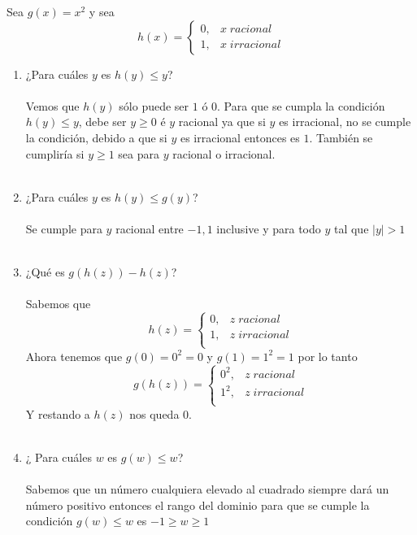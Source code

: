\begin{ej}
Sea $g(x)=x^2$ y sea 
\begin{equation}
h(x) = \left\lbrace
\begin{array}{rr}
0, & x \; racional\\
1, & x \; irracional
\end{array}
\right.
\end{equation}
\begin{enumerate}[\bfseries i)]
\item ¿Para cuáles $y$ es $h(y)\leq y$?\\\\
Vemos que $h(y)$ sólo puede ser $1$ ó $0$. Para que se cumpla la condición $h(y)\leq y$, \; debe ser $y\geq 0$ é $y$ racional ya que si $y$ es irracional, no se cumple la condición, debido a que si $y$ es irracional  entonces es $1$. También se cumpliría si $y\geq 1$ sea para $y$ racional o irracional.\\\\

\item ¿Para cuáles $y$ es $h(y) \leq g(y)$?\\\\
Se cumple para $y$ racional entre $-1,1$ inclusive y para todo $y$ tal que $|y| > 1$\\\\

\item ¿Qué es $g(h(z)) - h(z)$?\\\\
Sabemos que 
\begin{equation}
h(z) = \left\lbrace
\begin{array}{rl}
0, & z \; racional\\
1, & z \; irracional\\
\end{array}
\right.
\end{equation}
Ahora tenemos que $g(0) = 0^2 = 0$ \; y \; $g(1)=1^2=1$ por lo tanto 
\begin{equation}
g(h(z)) = \left\lbrace
\begin{array}{rl}
0^2, & z \; racional\\
1^2, & z \; irracional\\
\end{array}
\right.
\end{equation}
Y restando a $h(z)$ nos queda $0$.\\\\
\item ¿ Para cuáles $w$ es $g(w) \leq w$?\\\\
Sabemos que un número cualquiera elevado al cuadrado siempre dará un número positivo entonces el rango del dominio para que se cumple la condición $g(w) \leq w$ es $-1\geq w \geq 1$\\\\ 


\end{enumerate}
\end{ej}
